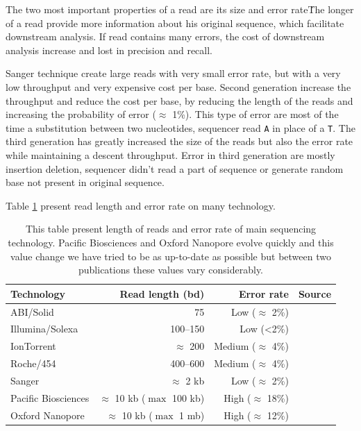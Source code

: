 \documentclass[./main.tex]{subfiles}
\begin{document}
The two most important properties of a read are its size and error rate\. The longer of a read provide more information about his original sequence, which facilitate downstream analysis. If read contains many errors, the cost of downstream analysis increase and lost in precision and recall.

Sanger technique create large reads with very small error rate, but with a very low throughput and very expensive cost per base.
Second generation increase the throughput and reduce the cost per base, by reducing the length of the reads and increasing the probability of error ($\approx$ 1\%). This type of error are most of the time a substitution between two nucleotides, sequencer read \texttt{A} in place of a \texttt{T}.
The third generation has greatly increased the size of the reads but also the error rate while maintaining a descent throughput. Error in third generation are mostly insertion deletion, sequencer didn't read a part of sequence or generate random base not present in original sequence.

Table \ref{intro:tab:technology_property} present read length and error rate on many technology.

\begin{table}[ht]
    \centering
    \begin{tabular}{l|rr|l}
         Technology          & Read length (bd)                 & Error rate    & Source                          \\ \hline
         ABI/Solid           & 75                               & Low ($\approx$ 2\%)    & \cite{seq_assembly_demystified} \\
         Illumina/Solexa     & 100–150                          & Low (<2\%)             & \cite{seq_assembly_demystified} \\
         IonTorrent          & $\approx$ 200                    & Medium ($\approx$ 4\%) & \cite{seq_assembly_demystified} \\
         Roche/454           & 400–600                          & Medium ($\approx$ 4\%) & \cite{seq_assembly_demystified} \\
         Sanger              & $\approx$ 2 kb                   & Low ($\approx$ 2\%)    & \cite{seq_assembly_demystified} \\
         Pacific Biosciences & $\approx$ 10 kb ($\max$ 100 kb)  & High ($\approx$ 18\%)  & \cite{seq_assembly_demystified} \cite{longread_dark_matter} \\
         Oxford Nanopore     & $\approx$ 10 kb ($\max$ 1 mb)    & High ($\approx$ 12\%)  & \cite{longread_dark_matter} \cite{nanopore_read_accuracy} \\
    \end{tabular}
    \caption{This table present length of reads and error rate of main sequencing technology. Pacific Biosciences and Oxford Nanopore evolve quickly and this value change we have tried to be as up-to-date as possible but between two publications these values vary considerably.}
    \label{intro:tab:technology_property}
\end{table}
\end{document}
